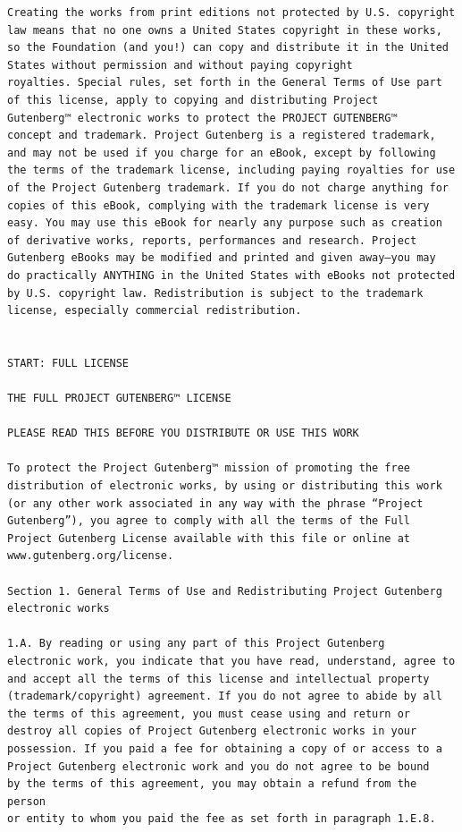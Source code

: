\documentclass{article}
\begin{document}
\begin{verbatim}
Creating the works from print editions not protected by U.S. copyright
law means that no one owns a United States copyright in these works,
so the Foundation (and you!) can copy and distribute it in the United
States without permission and without paying copyright
royalties. Special rules, set forth in the General Terms of Use part
of this license, apply to copying and distributing Project
Gutenberg™ electronic works to protect the PROJECT GUTENBERG™
concept and trademark. Project Gutenberg is a registered trademark,
and may not be used if you charge for an eBook, except by following
the terms of the trademark license, including paying royalties for use
of the Project Gutenberg trademark. If you do not charge anything for
copies of this eBook, complying with the trademark license is very
easy. You may use this eBook for nearly any purpose such as creation
of derivative works, reports, performances and research. Project
Gutenberg eBooks may be modified and printed and given away—you may
do practically ANYTHING in the United States with eBooks not protected
by U.S. copyright law. Redistribution is subject to the trademark
license, especially commercial redistribution.


START: FULL LICENSE

THE FULL PROJECT GUTENBERG™ LICENSE

PLEASE READ THIS BEFORE YOU DISTRIBUTE OR USE THIS WORK

To protect the Project Gutenberg™ mission of promoting the free
distribution of electronic works, by using or distributing this work
(or any other work associated in any way with the phrase “Project
Gutenberg”), you agree to comply with all the terms of the Full
Project Gutenberg License available with this file or online at
www.gutenberg.org/license.

Section 1. General Terms of Use and Redistributing Project Gutenberg
electronic works

1.A. By reading or using any part of this Project Gutenberg
electronic work, you indicate that you have read, understand, agree to
and accept all the terms of this license and intellectual property
(trademark/copyright) agreement. If you do not agree to abide by all
the terms of this agreement, you must cease using and return or
destroy all copies of Project Gutenberg electronic works in your
possession. If you paid a fee for obtaining a copy of or access to a
Project Gutenberg electronic work and you do not agree to be bound
by the terms of this agreement, you may obtain a refund from the person
or entity to whom you paid the fee as set forth in paragraph 1.E.8.


\end{verbatim}
\end{document}
